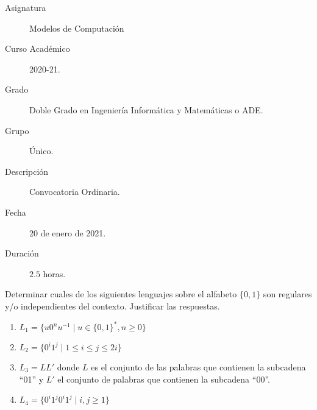 \documentclass[12pt]{article}
\begin{document}

    
    

    \begin{description}
        \item[Asignatura] Modelos de Computación
        \item[Curso Académico] 2020-21.
        \item[Grado] Doble Grado en Ingeniería Informática y Matemáticas o ADE.
        \item[Grupo] Único.
        \item[Descripción] Convocatoria Ordinaria.
        \item[Fecha] 20 de enero de 2021.
        \item[Duración] $2.5$ horas.    
    \end{description}
    \newpage

    \begin{ejercicio}[2.5 puntos]
        Determinar cuales de los siguientes lenguajes sobre el alfabeto $\{0, 1\}$ son regulares y/o independientes del contexto.
        Justificar las respuestas.
        \begin{enumerate}
            \item $L_1 = \{u0^n u^{-1} \mid u \in \{0, 1\}^*, n \geq 0\}$
            \item $L_2 = \{0^i 1^j \mid 1 \leq i \leq j \leq 2i\}$
            \item $L_3 = LL'$ donde $L$ es el conjunto de las palabras que contienen la subcadena ``01'' y $L'$ el conjunto de palabras
            que contienen la subcadena ``00''.
            \item $L_4 = \{0^i 1^j 0^i 1^j \mid i, j \geq 1\}$
        \end{enumerate}
    \end{ejercicio}
\end{document}

